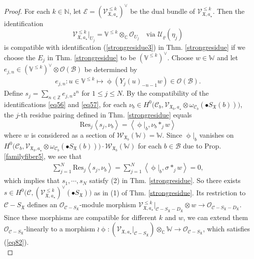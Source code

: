 \documentclass[11pt,b5paper,notitlepage]{article}
\theoremstyle{definition}
\theoremstyle{plain}
\newcommand{\fk}{\mathfrak}
\newcommand{\mc}{\mathcal}
\newcommand{\Res}{\mathrm{Res}}
\newcommand{\SV}{\mathscr{V}}
\newcommand{\scr}{\mathscr}
\newcommand{\SX}{{S_{\fk X}}}
\newcommand{\DX}{D_{\fk X}}
\newcommand{\blt}{\bullet}
\newcommand{\Vbb}{\mathbb V}
\newcommand{\Wbb}{\mathbb W}
\newcommand{\Cbb}{\mathbb C}
\newcommand{\Nbb}{\mathbb N}
\newcommand{\Zbb}{\mathbb Z}
\newcommand{\<}{\left\langle}
\renewcommand{\>}{\right\rangle}
\newcommand{\MO}{\mathcal{O}}
\newcommand{\MU}{\mathcal{U}}
\newcommand{\MC}{\mathcal{C}}
\newcommand{\MB}{\mathcal{B}}
\newcommand{\fx}{\mathfrak{X}}
\newcommand{\SW}{\mathscr{W}}
\numberwithin{equation}{section}
\begin{document}
\begin{proof}
For each $k\in \Nbb$, let $\scr E=(\SV_{\fx,a_\star}^{\leq k})^\vee$        be the dual bundle of $\SV_{\fx,a_\star}^{\leq k}$. Then the identification
        \begin{equation}\label{eq57}
        \SV_{\fx,a_\star}^{\leq k}\vert_{U_j}=\Vbb^{\leq k}\otimes_\Cbb \MO_{U_j} \quad \text{via }\MU_\varrho(\eta_j)
        \end{equation}
        is compatible with identification (\ref{strongresidue3}) in Thm. \ref{strongresidue} if we choose the $E_j$ in Thm. \ref{strongresidue}  to be $(\Vbb^{\leq k})^\vee$. Choose $w\in \Wbb$ and let $e_{j,n}\in (\Vbb^{\leq k})^\vee\otimes \MO(\MB)$ be determined by
\begin{align}
e_{j,n}:        u\in \Vbb^{\leq k}\mapsto \upphi(Y_j(u)_{-n-1}w)\in \MO(\MB).
\end{align}
        Define $s_j=\sum_{n\in \Zbb}e_{j,n}z^n$ for $1\leq j \leq N$. By the compatibility of the identifications \eqref{eq56} and \eqref{eq57}, for each $\nu_b\in H^0\big(\MC_b,\SV_{\fx_b,a_\star}\otimes \omega_{\MC_b}(\blt S_\fx(b))\big)$, the $j$-th residue pairing defined in Thm. \ref{strongresidue} equals
        $$
        \Res_j \<s_j,\nu_b\>=\<\upphi\vert_b,\nu_b *_j w\>
        $$
where $w$ is considered as a section of $\SW_{\fx_b}(\Wbb)=\Wbb$. Since $\upphi\vert_b$ vanishes on $H^0\big(\MC_b,\SV_{\fx_b,a_\star}\otimes \omega_{\MC_b}(\blt S_\fx(b))\big)\cdot \SW_{\fx_b}(\Wbb)$ for each $b\in \MB$ due to Prop. \ref{familyfiber5}, we see that
\begin{gather*}
\sum_{j=1}^N \Res_j \<s_j,\nu_b\>=\sum_{j=1}^N\<\upphi\vert_b,\sigma *_j w\>=0,
\end{gather*}
which implies that $s_1,\cdots,s_N$ satisfy (2) in Thm. \ref{strongresidue}. So there exists $s\in H^0\big(\MC,(\SV_{\fx,a_\star}^{\leq k})^\vee(\blt S_\fx)\big)$ as in (1) of Thm. \ref{strongresidue}. Its restriction to $\mc C-\SX$ defines an $\MO_{\MC-S_\fx}$-module morphism $\SV_{\fx,a_\star}^{\leq k}|_{\mc C-\SX-\DX}\otimes w\rightarrow \MO_{\MC-S_\fx-D_\fx}$. Since these morphisms are compatible for different $k$ and $w$, we can extend them $\MO_{\MC-S_\fx}$-linearly to a morphism $\wr\upphi:(\SV_{\fx,a_\star}|_{\mc C-\SX})\otimes_\Cbb \Wbb\rightarrow \MO_{\MC-S_\fx}$, which satisfies (\ref{eq82}).\\



\end{proof}
\end{document}
